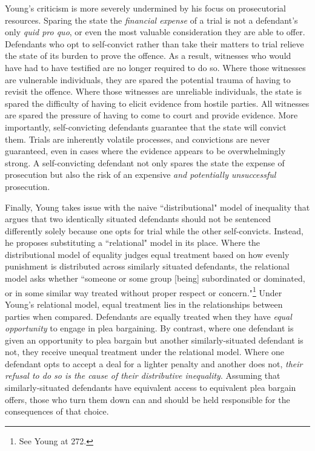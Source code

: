 Young's criticism is more severely undermined by his focus on prosecutorial resources. Sparing the state the \textit{financial expense} of a trial is not a defendant's only \textit{quid pro quo}, or even the most valuable consideration they are able to offer. Defendants who opt to self-convict rather than take their matters to trial relieve the state of its burden to prove the offence. As a result, witnesses who would have had to have testified are no longer required to do so. Where those witnesses are vulnerable individuals, they are spared the potential trauma of having to revisit the offence. Where those witnesses are unreliable individuals, the state is spared the difficulty of having to elicit evidence from hostile parties. All witnesses are spared the pressure of having to come to court and provide evidence. More importantly, self-convicting defendants guarantee that the state will convict them. Trials are inherently volatile processes, and convictions are never guaranteed, even in cases where the evidence appears to be overwhelmingly strong. A self-convicting defendant not only spares the state the expense of prosecution but also the risk of an expensive \textit{and potentially unsuccessful} prosecution.

Finally, Young takes issue with the naive ``distributional" model of inequality that argues that two identically situated defendants should not be sentenced differently solely because one opts for trial while the other self-convicts. Instead, he proposes substituting a ``relational" model in its place. Where the distributional model of equality judges equal treatment based on how evenly punishment is distributed across similarly situated defendants, the relational model asks whether ``someone or some group [being] subordinated or dominated, or in some similar way treated without proper respect or concern."\footnote{See Young at 272.} Under Young's relational model, equal treatment lies in the relationships between parties when compared. Defendants are equally treated when they have \textit{equal opportunity} to engage in plea bargaining. By contrast, where one defendant is given an opportunity to plea bargain but another similarly-situated defendant is not, they receive unequal treatment under the relational model. Where one defendant opts to accept a deal for a lighter penalty and another does not, \textit{their refusal to do so is the cause of their distributive inequality}. Assuming that similarly-situated defendants have equivalent access to equivalent plea bargain offers, those who turn them down can and should be held responsible for the consequences of that choice.

